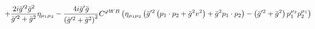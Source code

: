 %
\begin{dmath*}
%
  +  \frac{2 i {\bar g}^{\prime 2} {\bar g}{}^2}{{\bar g}^{\prime 2} + {\bar g}{}^2}\eta_{\mu_1 \mu_2}  -  \frac{4 i {\bar g}^\prime {\bar g}{}}{\left({\bar g}^{\prime 2} + {\bar g}{}^2\right)^2}C^{ \varphi  WB} \left(\eta_{\mu_1 \mu_2} \left({\bar g}^{\prime 2} \left(p_{1}\nobreak\cdot\nobreak{}p_{2} + {\bar g}{}^2 v^2\right) + {\bar g}{}^2 p_{1}\nobreak\cdot\nobreak{}p_{2}\right) - \left({\bar g}^{\prime 2} + {\bar g}{}^2\right) p_1^{\mu_2} p_2^{\mu_1}\right)
%
\end{dmath*}
%
